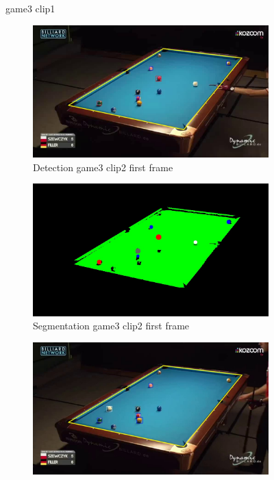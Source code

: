 \begin{figure}[H]
	\caption{game3 clip1}
\end{figure}

\begin{figure}[H]
	\centering
	\begin{subfigure}[b]{0.48\textwidth}
		\centering
		\includegraphics[width=\textwidth]{images/Detection/game3_clip2_detected_balls_first_frame.jpg}
		\caption{Detection game3 clip2 first frame}
		\label{fig: game3_clip2_first_frame_detected}
	\end{subfigure}
	\begin{subfigure}[b]{0.48\textwidth}
		\centering
		\includegraphics[width=\textwidth]{images/Segmentation/game3_clip2_segmented_balls_first_frame.jpg}
		\caption{Segmentation game3 clip2 first frame}
		\label{fig: game3_clip2_first_frame_segmented}
	\end{subfigure}
	\begin{subfigure}[b]{0.48\textwidth}
		\centering
		\includegraphics[width=\textwidth]{images/Detection/game3_clip2_detected_balls_last_frame.jpg}

\end{subfigure}
\end{figure}
